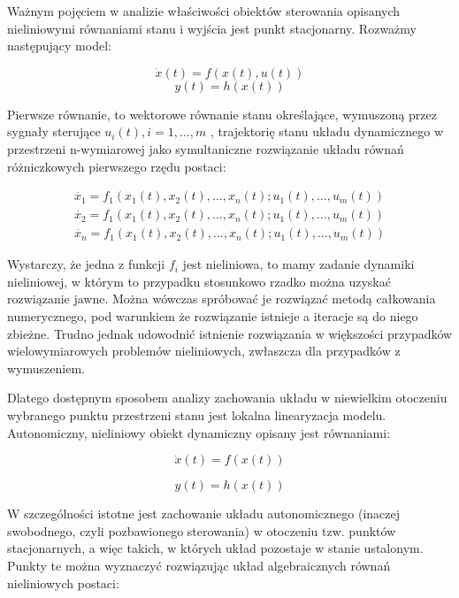 \documentclass{article}
\begin{document}
	Ważnym pojęciem w analizie właściwości obiektów sterowania opisanych nieliniowymi
	równaniami stanu i wyjścia jest punkt stacjonarny. Rozważmy następujący model:

	\begin{equation}
		\dot{x}(t) = f(x(t), u(t))
	\end{equation}
	\begin{equation}
		y(t) = h(x(t))
	\end{equation}

	Pierwsze równanie, to wektorowe równanie stanu określające, wymuszoną przez
	sygnały sterujące { $ u_i(t), i=1,...,m $ }, trajektorię stanu układu dynamicznego w przestrzeni
	n-wymiarowej jako symultaniczne rozwiązanie układu równań różniczkowych pierwszego rzędu postaci:

	\begin{equation}
		\begin{aligned}
			\dot{x_1} = f_1(x_1(t), x_2(t),...,x_n(t); u_1(t),...,u_m(t)) \\
			\dot{x_2} = f_1(x_1(t), x_2(t),...,x_n(t); u_1(t),...,u_m(t)) \\
			\dot{x_n} = f_1(x_1(t), x_2(t),...,x_n(t); u_1(t),...,u_m(t))
		\end{aligned}
	\end{equation}

	Wystarczy, że jedna z funkcji $f_i$ jest nieliniowa, to mamy zadanie dynamiki nieliniowej, w
	którym to przypadku stosunkowo rzadko można uzyskać rozwiązanie jawne. Można
	wówczas spróbować je rozwiązać metodą całkowania numerycznego, pod warunkiem że
	rozwiązanie istnieje a iteracje są do niego zbieżne. Trudno jednak udowodnić istnienie
	rozwiązania w większości przypadków wielowymiarowych problemów nieliniowych,
	zwłaszcza dla przypadków z wymuszeniem.

	Dlatego dostępnym sposobem analizy zachowania układu w niewielkim otoczeniu
	wybranego punktu przestrzeni stanu jest lokalna linearyzacja modelu. Autonomiczny,
	nieliniowy obiekt dynamiczny opisany jest równaniami:

	\begin{equation}
		\dot{x}(t) = f(x(t))
	\end{equation}

	\begin{equation}
		y(t) = h(x(t))
	\end{equation}

	W szczególności istotne jest zachowanie układu autonomicznego (inaczej swobodnego,
	czyli pozbawionego sterowania) w otoczeniu tzw. punktów stacjonarnych, a więc takich,
	w których układ pozostaje w stanie ustalonym. Punkty te można wyznaczyć rozwiązując
	układ algebraicznych równań nieliniowych postaci:
	
\end{document}
